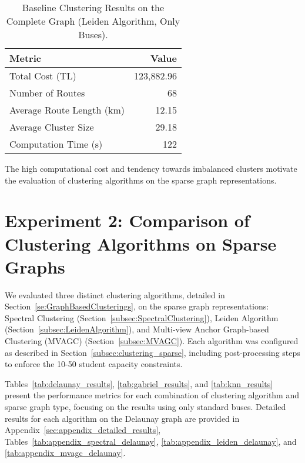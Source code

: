 \begin{table}[h]
\centering
\label{tab:complete_graph_clustering}
\begin{tabular}{lr}
\toprule
Metric & Value \\
\midrule
Total Cost (TL) & 123,882.96 \\
Number of Routes & 68 \\
Average Route Length (km) & 12.15 \\
Average Cluster Size & 29.18 \\
Computation Time (s) & 122 \\
\bottomrule
\end{tabular}
\caption{Baseline Clustering Results on the Complete Graph (Leiden Algorithm, Only Buses).}
\end{table}

The high computational cost and tendency towards imbalanced clusters motivate the evaluation of clustering algorithms on the sparse graph representations.

\section{Experiment 2: Comparison of Clustering Algorithms on Sparse Graphs}
\label{sec:exp_clustering}

We evaluated three distinct clustering algorithms, detailed in Section~\ref{se:GraphBasedClusterings}, on the sparse graph representations: Spectral Clustering (Section~\ref{subsec:SpectralClustering}), Leiden Algorithm (Section~\ref{subsec:LeidenAlgorithm}), and Multi-view Anchor Graph-based Clustering (MVAGC) (Section~\ref{subsec:MVAGC}). Each algorithm was configured as described in Section~\ref{subsec:clustering_sparse}, including post-processing steps to enforce the 10-50 student capacity constraints.

Tables~\ref{tab:delaunay_results}, \ref{tab:gabriel_results}, and \ref{tab:knn_results} present the performance metrics for each combination of clustering algorithm and sparse graph type, focusing on the results using only standard buses. Detailed results for each algorithm on the Delaunay graph are provided in Appendix~\ref{sec:appendix_detailed_results}, Tables~\ref{tab:appendix_spectral_delaunay}, \ref{tab:appendix_leiden_delaunay}, and \ref{tab:appendix_mvagc_delaunay}.

